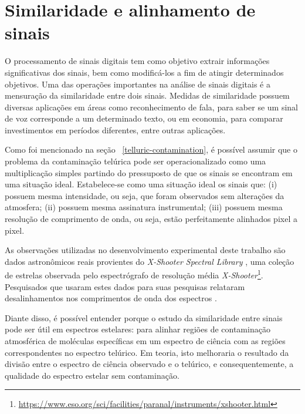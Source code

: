 \section{Similaridade e alinhamento de sinais}

O processamento de sinais digitais tem como objetivo extrair informações significativas dos sinais, bem como modificá-los a fim de atingir determinados objetivos. Uma das operações importantes na análise de sinais digitais é a mensuração da similaridade entre dois sinais. Medidas de similaridade possuem diversas aplicações em áreas como reconhecimento de fala, para saber se um sinal de voz corresponde a um determinado texto, ou em economia, para comparar investimentos em períodos diferentes, entre outras aplicações.

Como foi mencionado na seção ~\ref{telluric-contamination}, é possível assumir que o problema da contaminação telúrica pode ser operacionalizado como uma multiplicação simples partindo do pressuposto de que os sinais se encontram em uma situação ideal. Estabelece-se como uma situação ideal os sinais que: (i) possuem mesma intensidade, ou seja, que foram observados sem alterações da atmosfera; (ii) possuem mesma assinatura instrumental; (iii) possuem mesma resolução de comprimento de onda, ou seja, estão perfeitamente alinhados pixel a pixel. 

As observações utilizadas no desenvolvimento experimental deste trabalho são dados astronômicos reais provientes do \textit{X-Shooter Spectral Library} \citep{Chen2014TheXS}, uma coleção de estrelas observada pelo espectrógrafo de resolução média \textit{X-Shooter}\footnote{\url{https://www.eso.org/sci/facilities/paranal/instruments/xshooter.html}}. Pesquisados que usaram estes dados para suas pesquisas relataram desalinhamentos nos comprimentos de onda dos espectros \citep{wavelength-shifts}.

Diante disso, é possível entender porque o estudo da similaridade entre sinais pode ser útil em espectros estelares: para alinhar regiões de contaminação atmosférica de moléculas específicas em um espectro de ciência com as regiões correspondentes no espectro telúrico. Em teoria, isto melhoraria o resultado da divisão entre o espectro de ciência observado e o telúrico, e consequentemente, a qualidade do espectro estelar sem contaminação.

